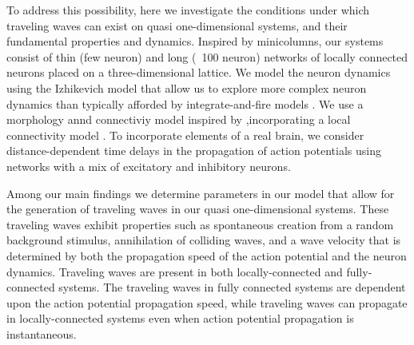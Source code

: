 \documentclass[12pt]{article}
\begin{document}
To address this possibility, here we investigate the conditions under which traveling waves can exist on quasi one-dimensional systems, and their fundamental properties and dynamics.  
Inspired by minicolumns, our systems consist of thin (few neuron) and long (~100 neuron) networks of locally connected neurons placed on a three-dimensional lattice.  
We model the neuron dynamics using the Izhikevich model \parencite{izhikevich2003} that allow us to explore more complex neuron dynamics than typically afforded by integrate-and-fire models \parencite{keane2015}\parencite{Senk2018}.
We use a morphology annd connectiviy model inspired by \parencite{maass2002},incorporating a local connectivity model \parencite{Levy2012}\parencite{Pyle2017}.
To incorporate elements of a real brain, we consider distance-dependent time delays in the propagation of action potentials using networks with a mix of excitatory and inhibitory neurons.

Among our main findings we determine parameters in our model that allow for the generation of traveling waves in our quasi one-dimensional systems. 
These traveling waves exhibit properties such as spontaneous creation from a random background stimulus, annihilation of colliding waves, and a wave velocity that is determined by both the propagation speed of the action potential and the neuron dynamics.
Traveling waves are present in both locally-connected and fully-connected systems. 
The traveling waves in fully connected systems are dependent upon the action potential propagation speed, while traveling waves can propagate in locally-connected systems even when action potential propagation is instantaneous.
\end{document}

